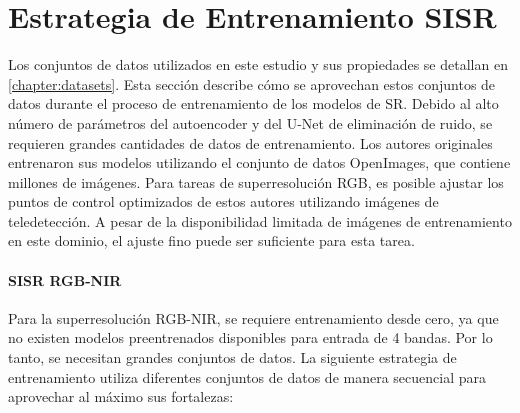 \section{Estrategia de Entrenamiento SISR}
Los conjuntos de datos utilizados en este estudio y sus propiedades se detallan en \autoref{chapter:datasets}. Esta sección describe cómo se aprovechan estos conjuntos de datos durante el proceso de entrenamiento de los modelos de SR. Debido al alto número de parámetros del autoencoder y del U-Net de eliminación de ruido, se requieren grandes cantidades de datos de entrenamiento. Los autores originales \autocite{rombach2022highresolution} entrenaron sus modelos utilizando el conjunto de datos OpenImages, que contiene millones de imágenes. Para tareas de superresolución RGB, es posible ajustar los puntos de control optimizados de estos autores utilizando imágenes de teledetección. A pesar de la disponibilidad limitada de imágenes de entrenamiento en este dominio, el ajuste fino puede ser suficiente para esta tarea.

\paragraph{SISR RGB-NIR}
Para la superresolución RGB-NIR, se requiere entrenamiento desde cero, ya que no existen modelos preentrenados disponibles para entrada de 4 bandas. Por lo tanto, se necesitan grandes conjuntos de datos. La siguiente estrategia de entrenamiento utiliza diferentes conjuntos de datos de manera secuencial para aprovechar al máximo sus fortalezas:

